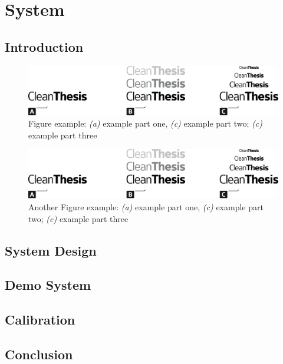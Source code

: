 %
\chapter{System}
\label{sec:system}




\section{Introduction}
\label{sec:system:intro}

\begin{figure}[htb]
	\includegraphics[width=\textwidth]{gfx/Clean-Thesis-Figure}
	\caption{Figure example: \textit{(a)} example part one, \textit{(c)} example part two; \textit{(c)} example part three}
	\label{fig:system:example1}
\end{figure}

\blindtext

\blindtext

\begin{figure}[htb]
	\includegraphics[width=\textwidth]{gfx/Clean-Thesis-Figure}
	\caption{Another Figure example: \textit{(a)} example part one, \textit{(c)} example part two; \textit{(c)} example part three}
	\label{fig:system:example2}
\end{figure}

\blindtext

\section{System Design}
\label{sec:system:design}

\blindtext

\section{Demo System}
\label{sec:system:Demo}

\blindtext

\section{Calibration}
\label{sec:system:calibration}

\blindtext

\section{Conclusion}
\label{sec:system:conclusion}

\blindtext
